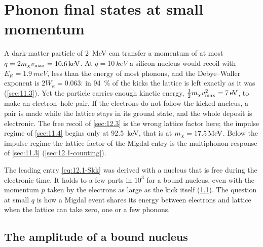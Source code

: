 \section{Phonon final states at small momentum}\label{sec:12.4}

A dark-matter particle of \SI{2}{MeV} can transfer a momentum of at most $q = 2m_{\chi} v_{\mathrm{max}} = \SI{10.6}{keV}$. At $q = \SI{10}{keV}$ a silicon nucleus would recoil with $E_R = \SI{1.9}{meV}$, less than the energy of most phonons, and the Debye--Waller exponent is $2W_\kappa = 0.063$: in \SI{94}{\percent} of the kicks the lattice is left exactly as it was (\cref{sec:11.3}). Yet the particle carries enough kinetic energy, $\frac12m_{\chi} v_{\mathrm{max}}^2 = \SI{7}{eV}$, to make an electron--hole pair. If the electrons do not follow the kicked nucleus, a pair is made while the lattice stays in its ground state, and the whole deposit is electronic. The free recoil of \cref{sec:12.3} is the wrong lattice factor here; the impulse regime of \cref{sec:11.4} begins only at \SI{92.5}{keV}, that is at $m_{\chi} = \SI{17.5}{MeV}$. Below the impulse regime the lattice factor of the Migdal entry is the multiphonon response of \cref{sec:11.3} (\cref{sec:12.1-counting}).

The leading entry \cref{eq:12.1-Skk} was derived with a nucleus that is free during the electronic time. It holds to a few parts in $10^3$ for a bound nucleus, even with the momentum $p$ taken by the electrons as large as the kick itself (\cref{sec:12.4-amp}). The question at small $q$ is how a Migdal event shares its energy between electrons and lattice when the lattice can take zero, one or a few phonons.

\subsection{The amplitude of a bound nucleus}\label{sec:12.4-amp}

